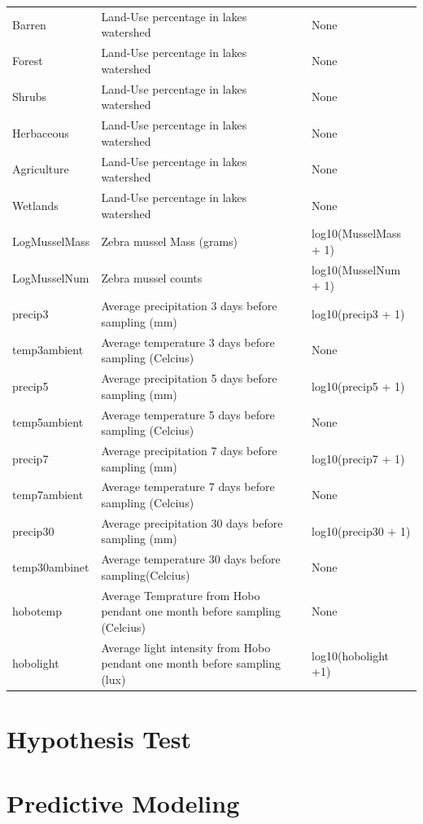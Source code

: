 \documentclass{ou-thesis}
\begin{document}
\begin{table}[!ht]
{\begin{tabular}{lll}
  Barren & Land-Use percentage in lakes watershed & None \\
  Forest & Land-Use percentage in lakes watershed & None \\
  Shrubs & Land-Use percentage in lakes watershed & None \\
  Herbaceous & Land-Use percentage in lakes watershed & None \\
  Agriculture & Land-Use percentage in lakes watershed & None \\
  Wetlands & Land-Use percentage in lakes watershed & None \\
  LogMusselMass & Zebra mussel Mass (grams) & log10(MusselMass + 1) \\
  LogMusselNum & Zebra mussel counts & log10(MusselNum + 1) \\
  precip3 & Average precipitation 3 days before sampling  (mm) & log10(precip3 + 1) \\
  temp3ambient & Average temperature 3 days before sampling (Celcius) & None \\
  precip5 & Average precipitation 5 days before sampling (mm) & log10(precip5 + 1) \\
  temp5ambient & Average temperature 5 days before sampling (Celcius) & None \\
  precip7 & Average precipitation 7 days before sampling (mm) & log10(precip7 + 1) \\
  temp7ambient & Average temperature 7 days before sampling (Celcius) & None \\
  precip30 & Average precipitation 30 days before sampling (mm) & log10(precip30 + 1) \\
  temp30ambinet & Average temperature 30 days before sampling(Celcius) & None \\
  hobotemp & Average Temprature from Hobo pendant one month before sampling (Celcius) & None \\
  hobolight & Average light intensity from Hobo pendant one month before sampling (lux) & log10(hobolight +1) \\
   \hline
\end{tabular}}
\end{table}




\section{Hypothesis Test}



\section{Predictive Modeling}
\end{document}
